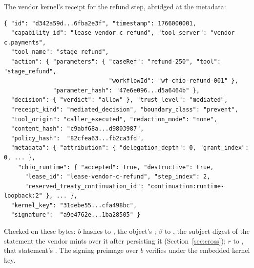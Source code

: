 The vendor kernel's receipt for the refund step, abridged at the metadata:
\begin{lstlisting}
{ "id": "d342a59d...6fba2e3f", "timestamp": 1766000001,
  "capability_id": "lease-vendor-c-refund", "tool_server": "vendor-c.payments",
  "tool_name": "stage_refund",
  "action": { "parameters": { "caseRef": "refund-250", "tool": "stage_refund",
                              "workflowId": "wf-chio-refund-001" },
              "parameter_hash": "47e6e096...d5a6464b" },
  "decision": { "verdict": "allow" }, "trust_level": "mediated",
  "receipt_kind": "mediated_decision", "boundary_class": "prevent",
  "tool_origin": "caller_executed", "redaction_mode": "none",
  "content_hash": "c9abf68a...d9803987",
  "policy_hash":  "82cfea63...fb2ca3fd",
  "metadata": { "attribution": { "delegation_depth": 0, "grant_index": 0, ... },
    "chio_runtime": { "accepted": true, "destructive": true,
      "lease_id": "lease-vendor-c-refund", "step_index": 2,
      "reserved_treaty_continuation_id": "continuation:runtime-loopback:2" }, ... },
  "kernel_key": "31debe55...cfa498bc",
  "signature":  "a9e4762e...1ba28505" }
\end{lstlisting}

\noindent
Checked on these bytes: $b$ hashes to , the
object's ; $\beta$ to , the subject
digest of the statement the vendor mints over it after persisting it
(Section~\ref{sec:cross}); $r$ to , that
statement's . The signing preimage over $b$ verifies
under the embedded kernel key.
